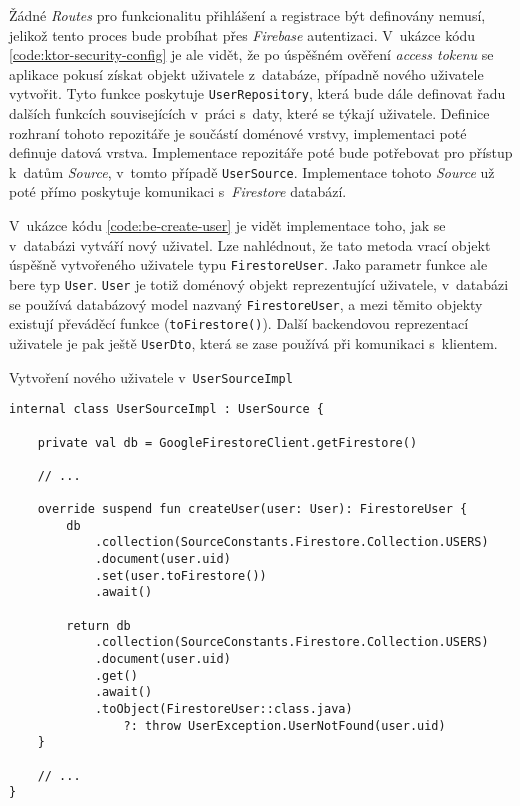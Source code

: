 Žádné \emph{Routes} pro funkcionalitu přihlášení a registrace být definovány nemusí, jelikož tento proces bude probíhat přes \emph{Firebase} autentizaci. V~ukázce kódu \ref{code:ktor-security-config} je ale vidět, že po úspěšném ověření \emph{access tokenu} se aplikace pokusí získat objekt uživatele z~databáze, případně nového uživatele vytvořit. Tyto funkce poskytuje \texttt{UserRepository}, která bude dále definovat řadu dalších funkcích souvisejících v~práci s~daty, které se týkají uživatele. Definice rozhraní tohoto repozitáře je součástí doménové vrstvy, implementaci poté definuje datová vrstva. Implementace repozitáře poté bude potřebovat pro přístup k~datům \emph{Source}, v~tomto případě \texttt{UserSource}. Implementace tohoto \emph{Source} už poté přímo poskytuje komunikaci s~\emph{Firestore} databází.

V~ukázce kódu \ref{code:be-create-user} je vidět implementace toho, jak se v~databázi vytváří nový uživatel. Lze nahlédnout, že tato metoda vrací objekt úspěšně vytvořeného uživatele typu \texttt{FirestoreUser}. Jako parametr funkce ale bere typ \texttt{User}. \texttt{User} je totiž doménový objekt reprezentující uživatele, v~databázi se používá databázový model nazvaný \texttt{FirestoreUser}, a mezi těmito objekty existují převáděcí funkce (\texttt{toFirestore()}). Další backendovou reprezentací uživatele je pak ještě \texttt{UserDto}, která se zase používá při komunikaci s~klientem.

\begin{listing}
\caption{Vytvoření nového uživatele v~\texttt{UserSourceImpl}}\label{code:be-create-user}
\begin{verbatim}
internal class UserSourceImpl : UserSource {

    private val db = GoogleFirestoreClient.getFirestore()
    
    // ...
    
    override suspend fun createUser(user: User): FirestoreUser {
        db
            .collection(SourceConstants.Firestore.Collection.USERS)
            .document(user.uid)
            .set(user.toFirestore())
            .await()

        return db
            .collection(SourceConstants.Firestore.Collection.USERS)
            .document(user.uid)
            .get()
            .await()
            .toObject(FirestoreUser::class.java) 
                ?: throw UserException.UserNotFound(user.uid)
    }
    
    // ...
}
\end{verbatim}
\end{listing}

